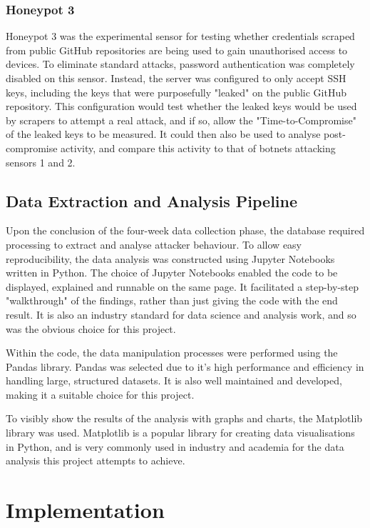 \documentclass[]{article}
\begin{document}
\subsubsection{Honeypot 3}

Honeypot 3 was the experimental sensor for testing whether credentials scraped from public GitHub repositories are being used to gain unauthorised access to devices. To eliminate standard attacks, password authentication was completely disabled on this sensor. Instead, the server was configured to only accept SSH keys, including the keys that were purposefully "leaked" on the public GitHub repository. This configuration would test whether the leaked keys would be used by scrapers to attempt a real attack, and if so, allow the "Time-to-Compromise" of the leaked keys to be measured. It could then also be used to analyse post-compromise activity, and compare this activity to that of botnets attacking sensors 1 and 2.

\subsection{Data Extraction and Analysis Pipeline}

Upon the conclusion of the four-week data collection phase, the database required processing to extract and analyse attacker behaviour. To allow easy reproducibility, the data analysis was constructed using Jupyter Notebooks \cite{jupyter} written in Python. The choice of Jupyter Notebooks enabled the code to be displayed, explained and runnable on the same page. It facilitated a step-by-step "walkthrough" of the findings, rather than just giving the code with the end result. It is also an industry standard for data science and analysis work, and so was the obvious choice for this project.

Within the code, the data manipulation processes were performed using the Pandas \cite{pandas} library. Pandas was selected due to it's high performance and efficiency in handling large, structured datasets. It is also well maintained and developed, making it a suitable choice for this project.

To visibly show the results of the analysis with graphs and charts, the Matplotlib \cite{Hunter:200:matplotlib} library was used. Matplotlib is a popular library for creating data visualisations in Python, and is very commonly used in industry and academia for the data analysis this project attempts to achieve.

\section{Implementation}
\end{document}
